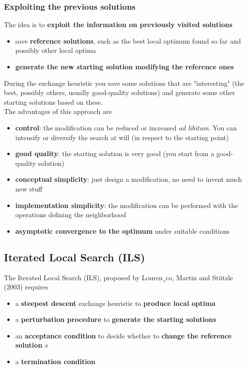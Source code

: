 \newpage

\subsubsection{Exploiting the previous solutions}
The idea is to \textbf{exploit the information on previously visited solutions}
\begin{itemize}
	\item save \textbf{reference solutions}, such as the best local optimum found so far and possibly other local optima
	
	\item \textbf{generate the new starting solution modifying the reference ones}
\end{itemize}

During the exchange heuristic you save some solutions that are "interesting" (the best, possibly others, usually good-quality solutions) and generate some other starting solutions based on these.\\ 

The advantages of this approach are
\begin{itemize}
	\item \textbf{control}: the modification can be reduced or increased \textit{ad libitum}. You can intensify or diversify the search at will (in respect to the starting point)
	
	\item \textbf{good quality}: the starting solution is very good (you start from a good-quality solution)
	
	\item \textbf{conceptual simplicity}: just design a modification, no need to invent much new stuff
	
	\item \textbf{implementation simplicity}: the modification can be performed with the operations defining the neighborhood
	
	\item \textbf{asymptotic convergence to the optimum} under suitable conditions
\end{itemize}

\newpage

\subsection{Iterated Local Search (ILS)}

The Iterated Local Search (ILS), proposed by Louren¸co, Martin and St\"utzle (2003) requires
\begin{itemize}
	\item a \textbf{steepest descent} exchange heuristic to \textbf{produce local optima}
	
	\item a \textbf{perturbation procedure} to \textbf{generate the starting solutions}
	
	\item an \textbf{acceptance condition} to decide whether to \textbf{change the reference solution} $x$
	
	\item a \textbf{termination condition}
\end{itemize}

